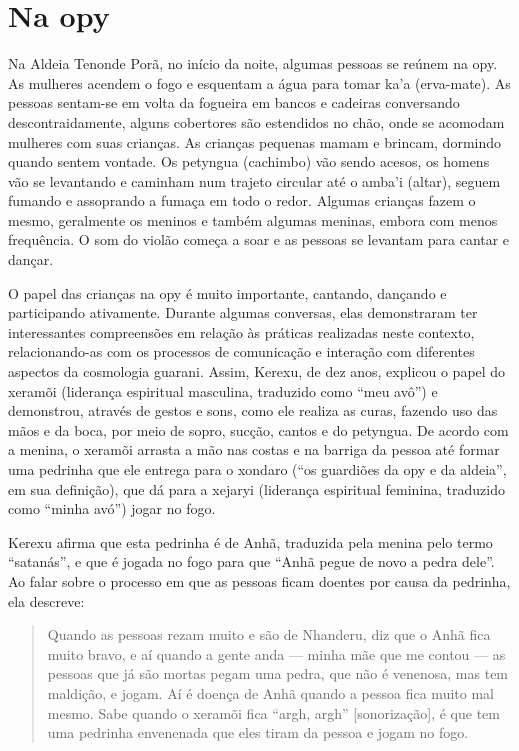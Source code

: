 \section{Na opy}

Na Aldeia Tenonde Porã, no início da noite, algumas pessoas se reúnem na
opy. As mulheres acendem o fogo e esquentam a água para tomar ka’a
(erva-mate). As pessoas sentam-se em volta da fogueira em bancos e
cadeiras conversando descontraidamente, alguns cobertores são
estendidos no chão, onde se acomodam mulheres com suas crianças. As
crianças pequenas mamam e brincam, dormindo quando sentem vontade. Os
petyngua (cachimbo) vão sendo acesos, os homens vão se levantando e
caminham num trajeto circular até o amba’i (altar), seguem fumando e
assoprando a fumaça em todo o redor. Algumas crianças fazem o mesmo,
geralmente os meninos e também algumas meninas, embora com menos
frequência. O som do violão começa a soar e as pessoas se levantam para
cantar e dançar. 

O papel das crianças na opy é muito importante, cantando, dançando e
participando ativamente. Durante algumas conversas, elas demonstraram
ter interessantes compreensões em relação às práticas realizadas neste
contexto, relacionando-as com os processos de comunicação e interação
com diferentes aspectos da cosmologia guarani. Assim, Kerexu, de dez
anos, explicou o papel do xeramõi (liderança espiritual masculina,
traduzido como ``meu avô'') e demonstrou, através de gestos e sons, como
ele realiza as curas, fazendo uso das mãos e da boca, por meio de
sopro, sucção, cantos e do petyngua. De acordo com a menina, o xeramõi
arrasta a mão nas costas e na barriga da pessoa até formar uma pedrinha
que ele entrega para o xondaro  (``os guardiões da opy e da aldeia'', em
sua definição), que dá para a xejaryi (liderança espiritual feminina,
traduzido como ``minha avó'') jogar no fogo. 

Kerexu afirma que esta pedrinha é de Anhã, traduzida pela menina pelo
termo ``satanás'', e que é jogada no fogo para que ``Anhã pegue de novo a
pedra dele''. Ao falar sobre o processo em que as pessoas ficam doentes
por causa da pedrinha, ela descreve:

\begin{quotation}
Quando as pessoas rezam muito e são de Nhanderu, diz que o Anhã fica
muito bravo, e aí quando a gente anda — minha mãe que me contou — as
pessoas que já são mortas pegam uma pedra, que não é venenosa, mas tem
maldição, e jogam. Aí é doença de Anhã quando a pessoa fica muito mal
mesmo. Sabe quando o xeramõi fica ``argh, argh'' [sonorização], é que tem
uma pedrinha envenenada que eles tiram da pessoa e jogam no fogo.
\end{quotation}

